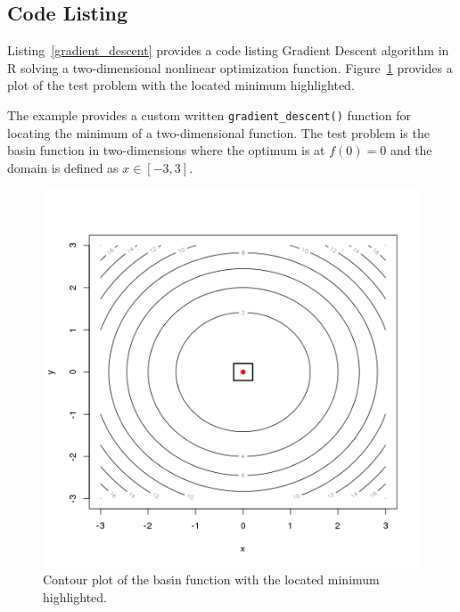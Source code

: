 \subsection{Code Listing}
Listing~\ref{gradient_descent} provides a code listing Gradient Descent algorithm in R solving a two-dimensional nonlinear optimization function. Figure~\ref{plot:gradient_descent_result} provides a plot of the test problem with the located minimum highlighted.

The example provides a custom written \texttt{gradient\_descent()} function for locating the minimum of a two-dimensional function.
The test problem is the basin function in two-dimensions where the optimum is at $f(0)=0$ and the domain is defined as $x \in [-3,3]$. 



\begin{figure}[htp]
\centering
\includegraphics[scale=0.45]{a_optimization/gradient_descent_result.png}
\caption{Contour plot of the basin function with the located minimum highlighted.}
\label{plot:gradient_descent_result}
\end{figure}

